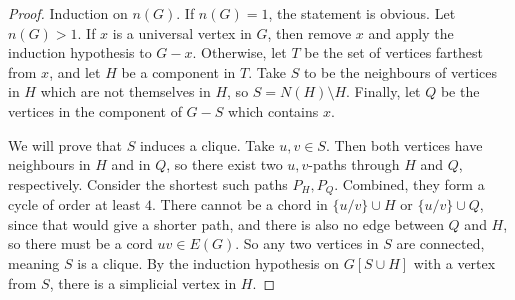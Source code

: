 \begin{proof}
  Induction on $n(G)$.
  If $n(G) = 1$, the statement is obvious.
  Let $n(G) > 1$.
  If $x$ is a universal vertex in $G$, then remove $x$ and apply the induction
  hypothesis to $G-x$.
  Otherwise, let $T$ be the set of vertices farthest from $x$, and let $H$ be a
  component in $T$.
  Take $S$ to be the neighbours of vertices in $H$ which are not themselves in
  $H$, so $S = N(H) \setminus H$.
  Finally, let $Q$ be the vertices in the component of $G-S$ which contains $x$.

  We will prove that $S$ induces a clique.
  Take $u, v \in S$.
  Then both vertices have neighbours in $H$ and in $Q$, so there exist two
  $u,v$-paths through $H$ and $Q$, respectively.
  Consider the shortest such paths $P_H, P_Q$.
  Combined, they form a cycle of order at least $4$.
  There cannot be a chord in $\{u/v\} \cup H$ or $\{u/v\} \cup Q$, since that
  would give a shorter path, and there is also no edge between $Q$ and $H$, so
  there must be a cord $uv \in E(G)$.
  So any two vertices in $S$ are connected, meaning $S$ is a clique.
  By the induction hypothesis on $G[S \cup H]$ with a vertex from $S$, there is
  a simplicial vertex in $H$.
\end{proof}

